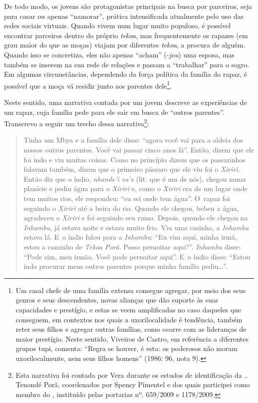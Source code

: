 De todo modo, os jovens são protagonistas principais na busca por
parceiros, seja para casar ou apenas ``namorar'', prática intensificada
atualmente pelo uso das redes sociais virtuais. Quando vivem num lugar
muito populoso, é possível encontrar parceiros dentro do próprio \emph{tekoa},
mas frequentemente os rapazes (em grau maior do que as moças) viajam
por diferentes \emph{tekoa}, a procura de alguém. Quando isso se concretiza,
eles não apenas ``acham'' (-\emph{jou}) uma esposa, mas também se inserem na sua
rede de relações e passam a ``trabalhar'' para o sogro. Em algumas
circunstâncias, dependendo da força política da família do rapaz, é
possível que a moça vá residir junto aos parentes dele\footnote{Um
casal chefe de uma família extensa consegue agregar, por meio dos seus
genros e seus descendentes, novas alianças que dão suporte às suas
capacidades e prestígio, e estas se veem amplificadas no caso daqueles
que conseguem, em contextos nos quais a uxorilocalidade é tendência,
também reter seus filhos e agregar outras famílias, como ocorre com as
lideranças de maior prestígio. Neste sentido, Viveiros de Castro, em
referência a diferentes grupos tupi, comenta: ``Regra se houver, é esta:
os poderosos não moram uxorilocalmente, nem seus filhos homens'' (1986:
96, nota 9).}. 

Neste sentido, uma narrativa contada por um jovem descreve as
experiências de um rapaz, cuja família pede para ele sair em busca de
``outros parentes''. Transcrevo a seguir um trecho dessa
narrativa\footnote{Esta narrativa foi contada por Vera durante os
estudos de identificação da .. Tenondé Porã, coordenados por Spensy
Pimentel e dos quais participei como membro do , instituído pelas
portarias nº. 659/2009 e 1178/2009.}: 

\begin{quote}
\noindent
Tinha um Mbya e a família dele disse: ``agora você vai para a aldeia dos
nossos outros parentes. Você vai passar cinco anos lá''. Então, dizem
que ele foi indo e viu muitas coisas. Como no princípio dizem que os
passarinhos falavam também, dizem que o primeiro pássaro que ele viu
foi o \emph{Xiriri}. Então diz que o índio, \emph{nhande’i va’e} (lit. que é um de
nós), chegou numa planície e pediu água para o \emph{Xiriri} e, como o \emph{Xiriri}
era de um lugar onde tem muitos rios, ele respondeu: ``eu sei onde tem
água''. O~rapaz foi seguindo o \emph{Xiriri} até a beira do rio. Quando ele
chegou, bebeu a água, agradeceu o \emph{Xiriri} e foi seguindo seu rumo.
Depois, quando ele chegou na \emph{Inhambu}, já estava noite e estava muito
frio. Viu uma casinha, a \emph{Inhambu} estava lá. E~o índio falou para a
\emph{Inhambu}: ``Eu vim aqui, minha irmã, estou a caminho de \emph{Tekoa Porã}. Posso
pernoitar aqui?''. \emph{Inhambu} disse: ``Pode sim, meu irmão. Você pode
pernoitar aqui''. E~o índio disse: ``Estou indo procurar meus outros
parentes porque minha família pediu\ldots''. 
\end{quote}

